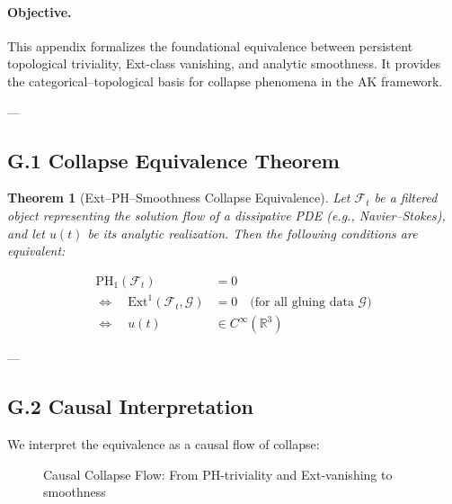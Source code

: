 \documentclass[11pt]{article}
\newtheorem{theorem}{Theorem}[section]
\begin{document}
\paragraph{Objective.}  
This appendix formalizes the foundational equivalence between persistent topological triviality, Ext-class vanishing, and analytic smoothness.  
It provides the categorical–topological basis for collapse phenomena in the AK framework.

---

\subsection*{G.1 Collapse Equivalence Theorem}

\begin{theorem}[Ext–PH–Smoothness Collapse Equivalence]
Let $\mathcal{F}_t$ be a filtered object representing the solution flow of a dissipative PDE (e.g., Navier–Stokes), and let $u(t)$ be its analytic realization.  
Then the following conditions are equivalent:

\begin{align*}
\mathrm{PH}_1(\mathcal{F}_t) &= 0 \\
\iff \quad \mathrm{Ext}^1(\mathcal{F}_t, \mathcal{G}) &= 0 \quad \text{(for all gluing data } \mathcal{G}) \\
\iff \quad u(t) &\in C^\infty(\mathbb{R}^3)
\end{align*}

\end{theorem}

---

\subsection*{G.2 Causal Interpretation}

We interpret the equivalence as a causal flow of collapse:

\begin{figure}[htbp]
\centering
{}
\caption{Causal Collapse Flow: From PH-triviality and Ext-vanishing to smoothness}
\end{figure}
\end{document}
